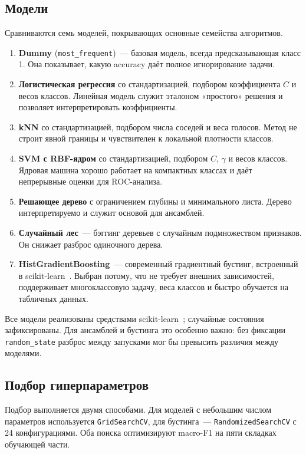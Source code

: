 \documentclass[14pt,a4paper]{extarticle}
\begin{document}
\subsection{Модели}

Сравниваются семь моделей, покрывающих основные семейства алгоритмов.

\begin{enumerate}
  \item \textbf{Dummy} (\texttt{most\_frequent})~--- базовая модель,
  всегда предсказывающая класс 1. Она показывает, какую accuracy даёт
  полное игнорирование задачи.
  \item \textbf{Логистическая регрессия} со стандартизацией, подбором
  коэффициента $C$ и весов классов. Линейная модель служит эталоном
  «простого» решения и позволяет интерпретировать коэффициенты.
  \item \textbf{kNN} со стандартизацией, подбором числа соседей и веса
  голосов. Метод не строит явной границы и чувствителен к локальной
  плотности классов.
  \item \textbf{SVM с RBF-ядром} со стандартизацией, подбором $C$,
  $\gamma$ и весов классов. Ядровая машина хорошо работает на компактных
  классах и даёт непрерывные оценки для ROC-анализа.
  \item \textbf{Решающее дерево} с ограничением глубины и минимального
  листа. Дерево интерпретируемо и служит основой для ансамблей.
  \item \textbf{Случайный лес}~--- бэггинг деревьев с случайным
  подмножеством признаков. Он снижает разброс одиночного дерева.
  \item \textbf{HistGradientBoosting}~--- современный градиентный
  бустинг, встроенный в scikit-learn~\cite{sklearn}. Выбран потому, что
  не требует внешних зависимостей, поддерживает многоклассовую задачу,
  веса классов и быстро обучается на табличных данных.
\end{enumerate}

Все модели реализованы средствами scikit-learn~\cite{sklearn}; случайные
состояния зафиксированы. Для ансамблей и бустинга это особенно важно:
без фиксации \texttt{random\_state} разброс между запусками мог бы
превысить различия между моделями.

\subsection{Подбор гиперпараметров}

Подбор выполняется двумя способами. Для моделей с небольшим числом
параметров используется \texttt{GridSearchCV}, для бустинга~---
\texttt{RandomizedSearchCV} с 24 конфигурациями. Оба поиска оптимизируют
macro-F1 на пяти складках обучающей части.
\end{document}
